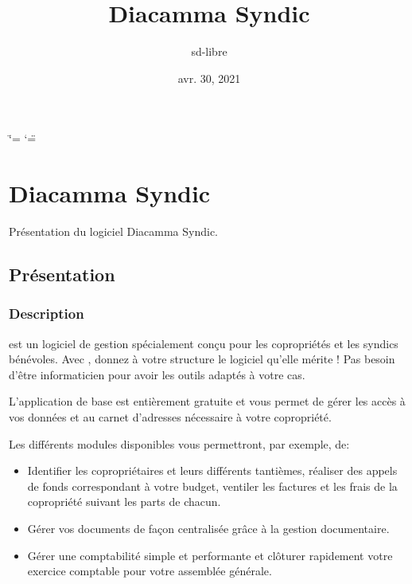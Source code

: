 \documentclass[a4paper,10pt,oneside,french]{sphinxmanual}
\title{Diacamma Syndic}
\date{avr. 30, 2021}
\author{sd-libre}
\begin{document}
\ifdefined\shorthandoff
  \ifnum\catcode`\=\string=\active\shorthandoff{=}\fi
  \ifnum\catcode`\"=\active{}\fi
\fi

\pagestyle{empty}
\sphinxmaketitle
\pagestyle{plain}
\sphinxtableofcontents
\pagestyle{normal}
\label{\detokenize{index::doc}}



\chapter{Diacamma Syndic}
\label{\detokenize{syndic/index:diacamma-syndic}}\label{\detokenize{syndic/index::doc}}
\sphinxAtStartPar
Présentation du logiciel Diacamma Syndic.


\section{Présentation}
\label{\detokenize{syndic/presentation:presentation}}\label{\detokenize{syndic/presentation::doc}}

\subsection{Description}
\label{\detokenize{syndic/presentation:description}}
\sphinxAtStartPar
{} est un logiciel de gestion spécialement conçu pour les copropriétés et les syndics bénévoles.
Avec , donnez à votre structure le logiciel qu’elle mérite ! Pas besoin d’être informaticien pour avoir les outils adaptés à votre cas.

\sphinxAtStartPar
L’application de base est entièrement gratuite et vous permet de gérer les accès à vos données et au carnet d’adresses nécessaire à votre copropriété.

\sphinxAtStartPar
Les différents modules disponibles vous permettront, par exemple, de:
\begin{itemize}
\item {} 
\sphinxAtStartPar
Identifier les copropriétaires et leurs différents tantièmes, réaliser des appels de fonds correspondant à votre budget, ventiler les factures et les frais de la copropriété suivant les parts de chacun.

\item {} 
\sphinxAtStartPar
Gérer vos documents de façon centralisée grâce à la gestion documentaire.

\item {} 
\sphinxAtStartPar
Gérer une comptabilité simple et performante et clôturer rapidement votre exercice comptable pour votre assemblée générale.

\end{itemize}
\end{document}
